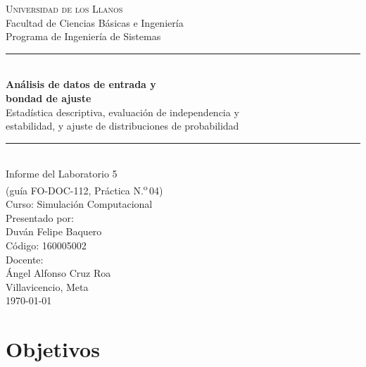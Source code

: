 \documentclass[11pt,letterpaper]{article}
\newcommand{\nombreEstudiante}{Duván Felipe Baquero}
\newcommand{\codigoEstudiante}{160005002}
\newcommand{\nombreDocente}{Ángel Alfonso Cruz Roa}
\begin{document}
\begin{titlepage}
\thispagestyle{empty}
\centering
\vspace*{\fill}

{\large \textsc{Universidad de los Llanos}}\\[0.2cm]
{\normalsize Facultad de Ciencias Básicas e Ingeniería}\\
{\normalsize Programa de Ingeniería de Sistemas}\\[1.6cm]

\rule{\textwidth}{0.8pt}\\[0.5cm]
{\LARGE \textbf{Análisis de datos de entrada y\\ bondad de ajuste}}\\[0.35cm]
{\large Estadística descriptiva, evaluación de independencia y\\
estabilidad, y ajuste de distribuciones de probabilidad}\\[0.5cm]
\rule{\textwidth}{0.8pt}\\[1.6cm]

{\normalsize Informe del Laboratorio 5}\\
{\normalsize (guía FO-DOC-112, Práctica N.\textsuperscript{o}\,04)}\\
{\normalsize Curso: Simulación Computacional}\\[1.4cm]

{\normalsize Presentado por:}\\[0.15cm]
{\large \nombreEstudiante}\\
{\normalsize Código: \codigoEstudiante}\\[1.2cm]

{\normalsize Docente:}\\[0.15cm]
{\large \nombreDocente}\\[1.6cm]

{\normalsize Villavicencio, Meta \\ \today}

\vspace*{\fill}
\end{titlepage}

\newpage
\tableofcontents
\newpage

\section{Objetivos}
\end{document}
